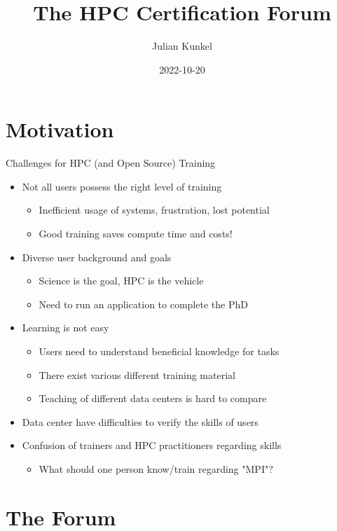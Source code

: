 \documentclass[compress,aspectratio=169]{beamer}
\subtitle{}
\title{\Large The HPC Certification Forum}
\author{Julian Kunkel}
\date{2022-10-20}
\institute{Institute for Computer Science / GWDG}
\begin{document}
\begin{frame}[plain]{}
	\maketitle
\end{frame}

\section{Motivation}
\begin{frame}{Challenges for HPC (and Open Source) Training}
		\begin{itemize}
			\item Not all users possess the right level of training
				\begin{itemize}
				\item Inefficient usage of systems, frustration, lost potential
				\item Good training saves compute time and costs!
				\end{itemize}
      \item Diverse user background and goals
        \begin{itemize}
          \item Science is the goal, HPC is the vehicle
          \item Need to run an application to complete the PhD
        \end{itemize}
      \item Learning is not easy
			\begin{itemize}
				\item Users need to understand beneficial knowledge for tasks
				\item There exist various different training material
				\item Teaching of different data centers is hard to compare
			\end{itemize}
			\item Data center have difficulties to verify the skills of users
      \item Confusion of trainers and HPC practitioners regarding skills
        \begin{itemize}
          \item What should one person know/train regarding "MPI"?
        \end{itemize}
		\end{itemize}
\end{frame}

\section{The Forum}
\sectionIntroHidden
\end{document}
